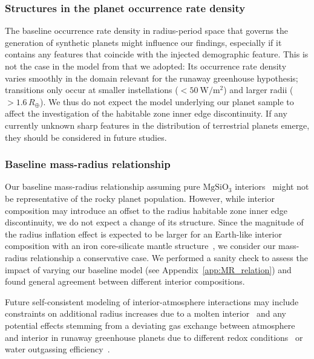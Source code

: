 \documentclass[twocolumn,twocolappendix,linenumbers]{aastex631}
\begin{document}
\subsubsection{Structures in the planet occurrence rate density}
The baseline occurrence rate density in radius-period space that governs the generation of synthetic planets might influence our findings, especially if it contains any features that coincide with the injected demographic feature.
This is not the case in the model from \citet{Bergsten2022} that we adopted: Its occurrence rate density varies smoothly in the domain relevant for the runaway greenhouse hypothesis; transitions only occur at smaller instellations ($< \SI{50}{\watt\per\meter\squared}$) and larger radii ($> 1.6\,R_\oplus$).
We thus do not expect the model underlying our planet sample to affect the investigation of the habitable zone inner edge discontinuity.
If any currently unknown sharp features in the distribution of terrestrial planets emerge, they should be considered in future studies.

\subsubsection{Baseline mass-radius relationship}
Our baseline mass-radius relationship assuming pure $\mathrm{MgSiO_3}$ interiors~\citep{Zeng2016} might not be representative of the rocky planet population.
However, while interior composition may introduce an offset to the radius habitable zone inner edge discontinuity, we do not expect a change of its structure.
Since the magnitude of the radius inflation effect is expected to be larger for an Earth-like interior composition with an iron core-silicate mantle structure~\citep{Zeng2016,Noack2020,2021JGRE..12606724B}, we consider our mass-radius relationship a conservative case.
We performed a sanity check to assess the impact of varying our baseline model (see Appendix~\ref{app:MR_relation}) and found general agreement between different interior compositions.

Future self-consistent modeling of interior-atmosphere interactions may include constraints on additional radius increases due to a molten interior~\citep{Bower2019} and any potential effects stemming from a deviating gas exchange between atmosphere and interior in runaway greenhouse planets due to different redox conditions~\citep{Ikoma2018,Lichtenberg2021c,2022PSJ.....3...93B,2021SSRv..217...22G} or water outgassing efficiency~\citep[e.g.,][]{Hier-Majumder2017,Ikoma2018,Salvador2023}.
\end{document}
